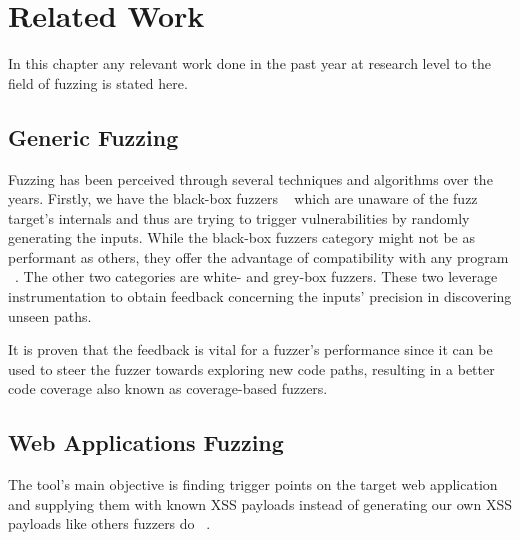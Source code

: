 \chapter{Related Work}
\label{sec:relatedwork}
\minitoc
\vspace*{1cm}

In this chapter any relevant work done in the past year at research level to the field of fuzzing is stated here.

\section{Generic Fuzzing}
Fuzzing has been perceived through several techniques and algorithms over the years. Firstly, we have the black-box fuzzers ~\cite{householder2012probability,sparks2007automated,woo2013scheduling} which are unaware of the fuzz target's internals and thus are trying to trigger vulnerabilities by randomly generating the inputs. While the black-box fuzzers category might not be as performant as others, they offer
the advantage of compatibility with any program ~\cite{osterlund2020parmesan,rawat2017vuzzer}. The other two categories are white- and grey-box fuzzers. These two leverage instrumentation to obtain feedback concerning the inputs' precision in discovering unseen paths. 

It is proven that the feedback is vital for a fuzzer’s performance since it can be used to steer the fuzzer towards exploring new code paths, resulting in a better code coverage also known as
coverage-based fuzzers.


\section{Web Applications Fuzzing}
The tool's main objective is finding trigger points on the target web application and supplying them with known XSS payloads instead of generating our own XSS payloads like others fuzzers do ~\cite{duchene2014kameleonfuzz}.